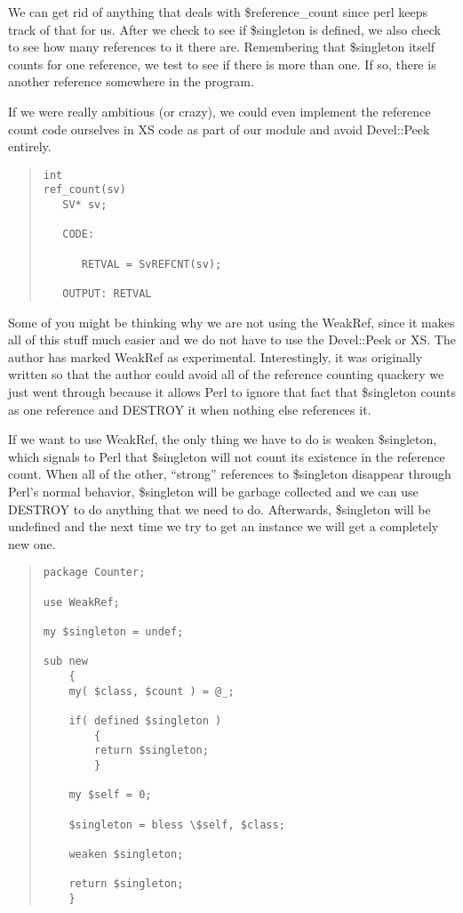 We can get rid of anything that deals with
\$reference\_count since perl keeps track of that for us. 
After we check to see if \$singleton is defined, we also
check to see how many references to it there are.
Remembering that \$singleton itself counts for one
reference, we test to see if there is more than one.  If so,
there is another reference somewhere in the program.

If we were really ambitious (or crazy), we could even
implement the reference count code ourselves in XS code as
part of our module and avoid Devel::Peek entirely.

\begin{quote}    
\begin{verbatim}
int
ref_count(sv)
   SV* sv;

   CODE:

      RETVAL = SvREFCNT(sv);

   OUTPUT: RETVAL
\end{verbatim}
\end{quote}    

Some of you might be thinking why we are not using the
WeakRef, since it makes all of this stuff much easier and we
do not have to use the Devel::Peek or XS.  The author has
marked WeakRef as experimental.  Interestingly, it was
originally written so that the author could avoid all of the
reference counting quackery we just went through because it
allows Perl to ignore that fact that \$singleton counts
as one reference and DESTROY it when nothing else references
it.

If we want to use WeakRef, the only thing we have to do is
weaken \$singleton, which signals to  Perl that \$singleton
will not count its
existence in the reference count. When all of the other,
``strong'' references to \$singleton disappear through Perl's
normal behavior, \$singleton will be garbage collected and
we can use DESTROY to do anything that we need to do.  Afterwards,
\$singleton will be undefined and the next time we try to 
get an instance we will get a completely new one.


\begin{quote}    
\begin{verbatim}
package Counter;

use WeakRef;

my $singleton = undef;

sub new
    {
    my( $class, $count ) = @_;

    if( defined $singleton )
        {
        return $singleton;
        }

    my $self = 0;

    $singleton = bless \$self, $class;

    weaken $singleton;

    return $singleton;
    }
\end{verbatim}
\end{quote}    


